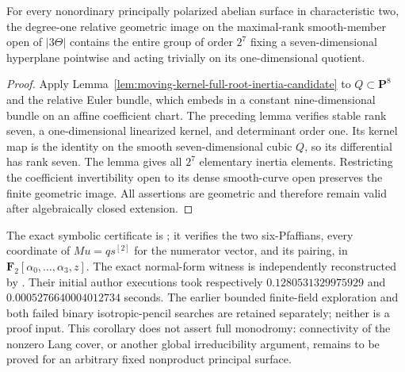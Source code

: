 \begin{corollary}
\label{cor:nonordinary-ppav-uniform-root-inertia-candidate}
For every nonordinary principally polarized abelian surface in
characteristic two, the degree-one relative geometric image on the
maximal-rank smooth-member open of $|3\Theta|$ contains the entire
group of order $2^7$ fixing a seven-dimensional hyperplane pointwise
and acting trivially on its one-dimensional quotient.
\end{corollary}
\begin{proof}
Apply Lemma~\ref{lem:moving-kernel-full-root-inertia-candidate}
to $Q\subset\mathbf P^8$ and the relative Euler bundle, which embeds
in a constant nine-dimensional bundle on an affine coefficient chart.
The preceding lemma verifies stable rank seven, a one-dimensional
linearized kernel, and determinant order one. Its kernel map is the
identity on the smooth seven-dimensional cubic $Q$, so its differential
has rank seven. The lemma gives all $2^7$ elementary inertia elements.
Restricting the coefficient invertibility open to its dense smooth-curve
open preserves the finite geometric image. All assertions are geometric
and therefore remain valid after algebraically closed extension.
\end{proof}

\begin{remark}
\label{rem:nonordinary-ppav-uniform-root-scope-candidate}
The exact symbolic certificate is
;
it verifies the two six-Pfaffians, every coordinate of $Mu=q s^{[2]}$
for the numerator vector, and its pairing, in
$\mathbf F_2[\alpha_0,\ldots,\alpha_3,z]$.
The exact normal-form witness is independently reconstructed by
.
Their initial author executions took respectively
$0.1280531329975929$ and $0.0005276640004012734$ seconds.
The earlier bounded finite-field exploration and both failed binary
isotropic-pencil searches are retained separately; neither is a proof
input. This corollary does not assert full monodromy: connectivity of
the nonzero Lang cover, or another global irreducibility argument,
remains to be proved for an arbitrary fixed nonproduct principal surface.
\end{remark}
